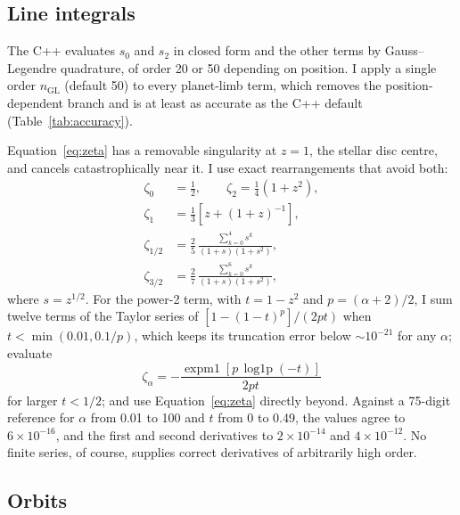 \documentclass[twocolumn]{aastex701}
\begin{document}
\subsection{Line integrals} \label{sec:quadrature}

The C++ evaluates $s_0$ and $s_2$ in closed form and the other terms by
Gauss--Legendre quadrature, of order 20 or 50 depending on position. I
apply a single order $n_\mathrm{GL}$ (default 50) to every planet-limb
term, which removes the position-dependent branch and is at least as
accurate as the C++ default (Table~\ref{tab:accuracy}).

Equation~\eqref{eq:zeta} has a removable singularity at $z=1$, the
stellar disc centre, and cancels catastrophically near it. I use exact
rearrangements that avoid both:
\begin{align}
\zeta_0 &= \tfrac{1}{2}, \qquad
\zeta_2 = \tfrac{1}{4}(1+z^2), \\
\zeta_1 &= \tfrac{1}{3}\left[z + (1+z)^{-1}\right], \\
\zeta_{1/2} &= \frac{2}{5}\,\frac{\sum_{k=0}^{4} s^k}{(1+s)(1+s^2)}, \\
\zeta_{3/2} &= \frac{2}{7}\,\frac{\sum_{k=0}^{6} s^k}{(1+s)(1+s^2)},
\end{align}
where $s = z^{1/2}$. For the power-2 term, with $t = 1-z^2$ and
$p=(\alpha+2)/2$, I sum twelve terms of the Taylor series of
$[1-(1-t)^p]/(2pt)$ when $t < \min(0.01, 0.1/p)$, which keeps its
truncation error below ${\sim}10^{-21}$ for any $\alpha$; evaluate
\begin{equation}
\zeta_\alpha = -\frac{\operatorname{expm1}\!\left[p\,
\operatorname{log1p}(-t)\right]}{2pt}
\end{equation}
for larger $t < 1/2$; and use Equation~\eqref{eq:zeta} directly beyond.
Against a 75-digit reference for $\alpha$ from 0.01 to 100 and $t$ from 0 to
0.49, the values agree to $6\times10^{-16}$, and the first and second
derivatives to $2\times10^{-14}$ and $4\times10^{-12}$. No
finite series, of course, supplies correct derivatives of arbitrarily
high order.

\subsection{Orbits} \label{sec:orbit}
\end{document}
